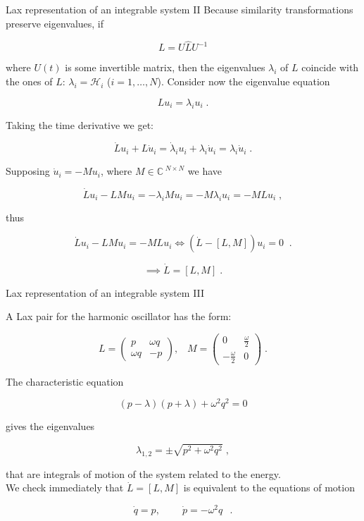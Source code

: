 \documentclass[aspectratio=169, 9pt]{beamer}
\begin{document}
\begin{frame}{Lax representation of an integrable system II}
Because similarity transformations preserve eigenvalues, if

\[L = U \hat LU^{-1}\]

where $U(t)$ is some invertible matrix, then the eigenvalues $\lambda_i$ of $L$ coincide with the ones of $\hat L$: $\lambda_i = \mathcal{H}_i$ ($i=1, \dots, N$). Consider now the eigenvalue equation

\[Lu_i = \lambda_i u_i\;.\]

Taking the time derivative we get:

\[\dot L u_i + L \dot u_i = \dot \lambda_i u_i + \lambda_i \dot u_i = \lambda_i \dot u_i\;.\]

Supposing $\dot u_i = - M u_i$, where $M \in \mathbb{C}^{\;N\times N}$ we have

\[\dot L u_i - LMu_i = -\lambda_i M u_i = - M \lambda_i u_i = - MLu_i\;,\]

thus

\[\dot L u_i - LMu_i = -MLu_i \iff (\dot L - [L,M])u_i = 0\;\;.\]

\[\implies \dot L = [L,M]\;.\]
\end{frame}

\begin{frame}{Lax representation of an integrable system III}
\begin{example}
A Lax pair for the harmonic oscillator has the form:

\[L = 
\begin{pmatrix}   
p & \omega q\\   
\omega q & -p  
\end{pmatrix},\;\;\;
M = 
\begin{pmatrix}   
0 & \frac{\omega}{2}\\   
-\frac{\omega}{2} & 0  
\end{pmatrix}\;.\]

The characteristic equation

\begin{equation}
    (p-\lambda) (p + \lambda) + \omega^2 q^2 = 0
\end{equation}

gives the eigenvalues

\begin{equation}
    \lambda_{1,2} = \pm \sqrt{p^2 + \omega^2 q^2}\;,
\end{equation}

that are integrals of motion of the system related to the energy. \\
We check immediately that $\dot L = [L, M]$ is equivalent to the equations of motion

\[\dot q = p, \;\;\;\;\;\;\;\;\dot p = -\omega^2 q\;\;\,.\]
\end{example} 
\end{frame}
\end{document}
